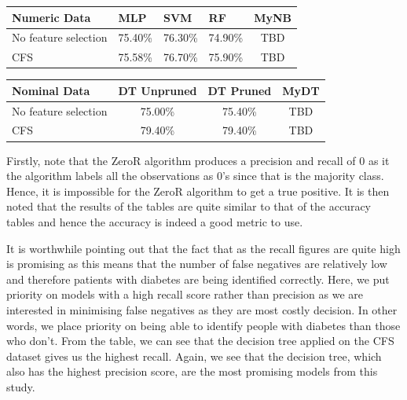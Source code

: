 \documentclass[12pt]{article}
\begin{document}
\begin{table}[H]
\centering
\begin{tabular}{|l|c|c|c|c|}
\hline
\textbf{Numeric Data}                       & \multicolumn{1}{l|}{\textbf{MLP}} & \multicolumn{1}{l|}{\textbf{SVM}} & \multicolumn{1}{l|}{\textbf{RF}} & \multicolumn{1}{l|}{\textbf{MyNB}} \\ \hline
No feature selection                  & 75.40\%                            & 76.30\%                                                      & 74.90\% &TBD                                            \\ \hline
CFS                     & 75.58\%                            & 76.70\%                                                     &75.90\% & TBD                                             \\ \hline
\end{tabular}
\end{table}


\begin{table}[H]
\centering
\begin{tabular}{|l|c|c|c|}
\hline
\textbf{Nominal Data}                       & \multicolumn{1}{l|}{\textbf{DT Unpruned}} & \multicolumn{1}{l|}{\textbf{DT Pruned}} & \multicolumn{1}{l|}{\textbf{MyDT}} \\ \hline
No feature selection                  & 75.00\%                            & 75.40\%                                                      & TBD                                             \\ \hline
CFS                     & 79.40\%                            & 79.40\%                                                      & TBD                                             \\ \hline
\end{tabular}
\end{table}

Firstly, note that the ZeroR algorithm produces a precision and recall of 0 as it the algorithm labels all the observations as 0's since that is the majority class. Hence, it is impossible for the ZeroR algorithm to get a true positive. It is then noted that the results of the tables are quite similar to that of the accuracy tables and hence the accuracy is indeed a good metric to use. 

It is worthwhile pointing out that the fact that as the recall figures are quite high is promising as this means that the number of false negatives are relatively low and therefore patients with diabetes are being identified correctly. Here, we put priority on models with a high recall score rather than precision as we are interested in minimising false negatives as they are most costly decision. In other words, we place priority on being able to identify people with diabetes than those who don't. From the table, we can see that the decision tree applied on the CFS dataset gives us the highest recall. Again, we see that the decision tree, which also has the highest precision score, are the most promising models from this study.
\end{document}
